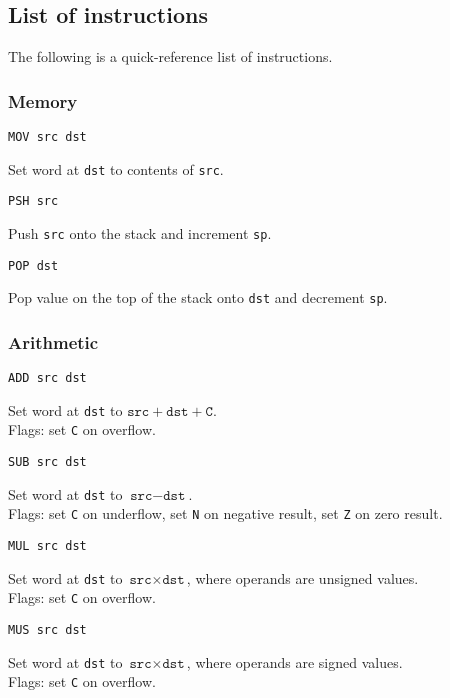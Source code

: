 \documentclass[a5paper,onecolumn,final,10pt]{memoir}
\let\ttt\texttt
\begin{document}
\footnotetext{Where \ttt{r} is \ttt{b} or \ttt{c}}

\subsection*{List of instructions}

The following is a quick-reference list of instructions. 

\newcommand\instruction[2]{%
	\noindent
	\begin{minipage}[t]{0.22\textwidth} \texttt{#1} \end{minipage}
	\hspace{0.03\textwidth}
	\begin{minipage}[t]{0.75\textwidth} #2 \end{minipage}
}

\subsubsection*{Memory}

\instruction{MOV src dst}{Set word at \texttt{dst} to contents of \texttt{src}.}

\instruction{PSH src}{Push \ttt{src} onto the stack and increment \ttt{sp}.}

\instruction{POP dst}{Pop value on the top of the stack onto \ttt{dst} and decrement \ttt{sp}.}

\subsubsection*{Arithmetic}

\instruction{ADD src dst}{%
	Set word at \texttt{dst} to $\texttt{src}+\texttt{dst}+\ttt{C}$. \\ 
	Flags: set \ttt{C} on overflow. 
}

\instruction{SUB src dst}{%
	Set word at \texttt{dst} to $\texttt{src}-\texttt{dst}$. \\ 
	Flags: set \ttt{C} on underflow, set \ttt{N} on negative result, set \ttt{Z} on zero result. 
}

\instruction{MUL src dst}{%
	Set word at \texttt{dst} to $\texttt{src}×\texttt{dst}$, where operands are unsigned values. \\ 
	Flags: set \ttt{C} on overflow.
}

\instruction{MUS src dst}{%
	Set word at \texttt{dst} to $\texttt{src}×\texttt{dst}$, where operands are signed values. \\ 
	Flags: set \ttt{C} on overflow.
}
\end{document}
